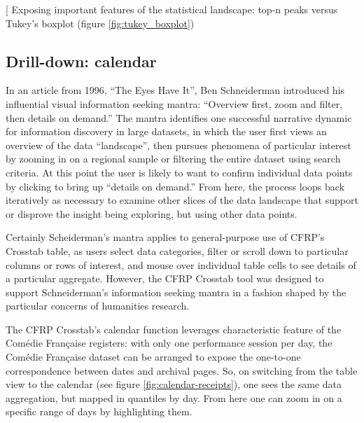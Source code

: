 \documentclass[	DIV=calc,%
							paper=a4,%
							fontsize=11pt,%
							twocolumn]{scrartcl}	 					%
\begin{document}
[ Exposing important features of the statistical landscape: top-n peaks versus Tukey’s boxplot (figure \ref{fig:tukey_boxplot})

\subsection*{Drill-down: calendar}

In an article from 1996, ``The Eyes Have It'', Ben Schneiderman introduced his influential visual information seeking mantra: ``Overview first, zoom and filter, then details on demand.''\cite{Shneiderman:1996}  The mantra identifies one successful narrative dynamic for information discovery in large datasets, in which the user first views an overview of the data ``landscape'', then pursues phenomena of particular interest by zooming in on a regional sample or filtering the entire dataset using search criteria.  At this point the user is likely to want to confirm individual data points by clicking to bring up ``details on demand.''  From here, the process loops back iteratively as necessary to examine other slices of the data landscape that support or disprove the insight being exploring, but using other data points.

Certainly Scheiderman’s mantra applies to general-purpose use of CFRP’s Crosstab table, as users select data categories, filter or scroll down to particular columns or rows of interest, and mouse over individual table cells to see details of a particular aggregate.  However, the CFRP Crosstab tool was designed to support Schneiderman’s information seeking mantra in a fashion shaped by the particular concerns of humanities research.

The CFRP Crosstab’s calendar function leverages characteristic feature of the Comédie Française registers: with only one performance session per day, the Comédie Française dataset can be arranged to expose the one-to-one correspondence between dates and archival pages.  So, on switching from the table view to the calendar (see figure \ref{fig:calendar-receipts}), one sees the same data aggregation, but mapped in quantiles by day.  From here one can zoom in on a specific range of days by highlighting them.
\end{document}
